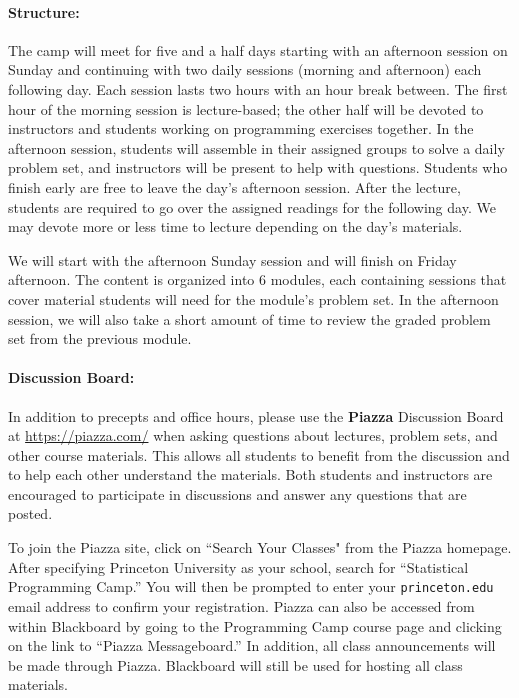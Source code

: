 \documentclass[12pt]{article}
\begin{document}
\paragraph{Structure:} The camp will meet for five and a half days
starting with an afternoon session on Sunday and continuing with two
daily sessions (morning and afternoon) each following day. Each
session lasts two hours with an hour break between. The first hour of
the morning session is lecture-based; the other half will be devoted
to instructors and students working on programming exercises
together. In the afternoon session, students will assemble in their
assigned groups to solve a daily problem set, and instructors will be
present to help with questions. Students who finish early are free to
leave the day's afternoon session. After the lecture, students are
required to go over the assigned readings for the following day. We
may devote more or less time to lecture depending on the day's
materials.

We will start with the afternoon Sunday session and will finish on
Friday afternoon.  The content is organized into 6 modules, each
containing sessions that cover material students will need for the
module's problem set. In the afternoon session, we will also take a
short amount of time to review the graded problem set from the
previous module.

\paragraph{Discussion Board:} 
In addition to precepts and office hours, please use the
\textbf{\textsf Piazza} Discussion Board at \url{https://piazza.com/}
when asking questions about lectures, problem sets, and other course
materials.  This allows all students to benefit from the discussion
and to help each other understand the materials. Both students and
instructors are encouraged to participate in discussions and answer
any questions that are posted.

To join the Piazza site, click on ``Search Your Classes" from
the Piazza homepage.  After specifying Princeton University as your
school, search for ``Statistical Programming Camp.'' You will
then be prompted to enter your {\tt princeton.edu} email address to
confirm your registration. Piazza can also be accessed from within
Blackboard by going to the Programming Camp course page and clicking on the
link to ``Piazza Messageboard.''  In addition, all class announcements
will be made through Piazza. Blackboard will still be used for hosting
all class materials. 
\end{document}
